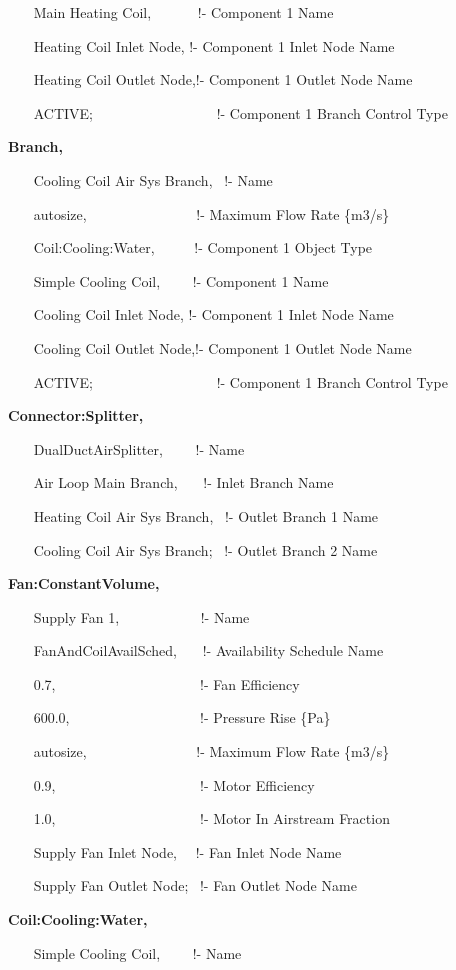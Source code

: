 ~~~ Main Heating Coil,~~~~~~ !- Component 1 Name

~~~ Heating Coil Inlet Node, !- Component 1 Inlet Node Name

~~~ Heating Coil Outlet Node,!- Component 1 Outlet Node Name

~~~ ACTIVE;~~~~~~~~~~~~~~~~~ !- Component 1 Branch Control Type

\textbf{Branch,}

~~~ Cooling Coil Air Sys Branch,~ !- Name

~~~ autosize,~~~~~~~~~~~~~~~ !- Maximum Flow Rate \{m3/s\}

~~~ Coil:Cooling:Water,~~~~~ !- Component 1 Object Type

~~~ Simple Cooling Coil,~~~~ !- Component 1 Name

~~~ Cooling Coil Inlet Node, !- Component 1 Inlet Node Name

~~~ Cooling Coil Outlet Node,!- Component 1 Outlet Node Name

~~~ ACTIVE;~~~~~~~~~~~~~~~~~ !- Component 1 Branch Control Type

\textbf{Connector:Splitter,}

~~~ DualDuctAirSplitter,~~~~ !- Name

~~~ Air Loop Main Branch,~~~ !- Inlet Branch Name

~~~ Heating Coil Air Sys Branch,~ !- Outlet Branch 1 Name

~~~ Cooling Coil Air Sys Branch;~ !- Outlet Branch 2 Name

\textbf{Fan:ConstantVolume,}

~~~ Supply Fan 1,~~~~~~~~~~~ !- Name

~~~ FanAndCoilAvailSched,~~~ !- Availability Schedule Name

~~~ 0.7,~~~~~~~~~~~~~~~~~~~~ !- Fan Efficiency

~~~ 600.0,~~~~~~~~~~~~~~~~~~ !- Pressure Rise \{Pa\}

~~~ autosize,~~~~~~~~~~~~~~~ !- Maximum Flow Rate \{m3/s\}

~~~ 0.9,~~~~~~~~~~~~~~~~~~~~ !- Motor Efficiency

~~~ 1.0,~~~~~~~~~~~~~~~~~~~~ !- Motor In Airstream Fraction

~~~ Supply Fan Inlet Node,~~ !- Fan Inlet Node Name

~~~ Supply Fan Outlet Node;~ !- Fan Outlet Node Name

\textbf{Coil:Cooling:Water,}

~~~ Simple Cooling Coil,~~~~ !- Name

